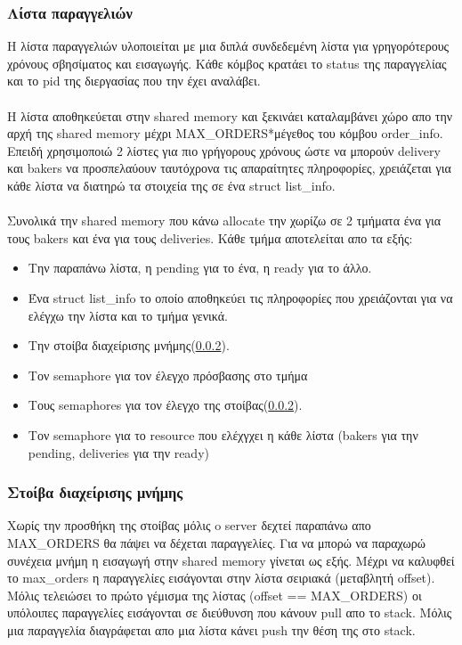 \documentclass{article}
\begin{document}
\subsubsection{Λίστα παραγγελιών}
\label{list_info}
Η λίστα παραγγελιών υλοποιείται με μια διπλά συνδεδεμένη λίστα για γρηγορότερους χρόνους σβησίματος και εισαγωγής. Κάθε κόμβος κρατάει το status της παραγγελίας και το pid της διεργασίας που την έχει αναλάβει.
\paragraph{}
Η λίστα αποθηκεύεται στην shared memory και ξεκινάει καταλαμβάνει χώρο απο την αρχή της shared memory μέχρι MAX\_ORDERS*μέγεθος του κόμβου order\_info. Επειδή χρησιμοποιώ 2 λίστες για πιο γρήγορους χρόνους ώστε να μπορούν delivery και bakers να προσπελαύουν ταυτόχρονα τις απαραίτητες πληροφορίες, χρειάζεται για κάθε λίστα να διατηρώ τα στοιχεία της σε ένα struct list\_info.
\paragraph{}
Συνολικά την shared memory που κάνω allocate την χωρίζω σε 2 τμήματα ένα για τους bakers και ένα για τους deliveries. Κάθε τμήμα αποτελείται απο τα εξής:
\begin{itemize}
 \item Την παραπάνω λίστα, η pending για το ένα, η ready για το άλλο.
 \item Ένα struct list\_info το οποίο αποθηκεύει τις πληροφορίες που χρειάζονται για να ελέγχω την λίστα και το τμήμα γενικά.
 \item Την στοίβα διαχείρισης μνήμης(\ref{stack}).
 \item Τον semaphore για τον έλεγχο πρόσβασης στο τμήμα
 \item Τους semaphores για τον έλεγχο της στοίβας(\ref{stack}).
 \item Τον semaphore για το resource που ελέχγχει η κάθε λίστα (bakers για την pending, deliveries για την ready)
\end{itemize}

\subsubsection{Στοίβα διαχείρισης μνήμης}
\label{stack}
Χωρίς την προσθήκη της στοίβας μόλις o server δεχτεί παραπάνω απο MAX\_ORDERS θα πάψει να δέχεται παραγγελίες. Για να μπορώ να παραχωρώ συνέχεια μνήμη η εισαγωγή στην shared memory γίνεται ως εξής. Μέχρι να καλυφθεί το max\_orders η παραγγελίες εισάγονται στην λίστα σειριακά (μεταβλητή offset). Μόλις τελειώσει το πρώτο γέμισμα της λίστας (offset == MAX\_ORDERS) οι υπόλοιπες παραγγελίες εισάγονται σε διεύθυνση που κάνουν pull απο το stack. Μόλις μια παραγγελία διαγράφεται απο μια λίστα κάνει push την θέση της στο stack.
\end{document}
